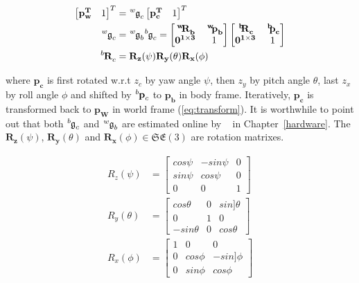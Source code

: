 \begin{equation}\label{eq:transform}
\begin{aligned}
\begin{bmatrix}\mathbf{p^T_w}&1\end{bmatrix}^T&=\tensor*[^w]{\mathfrak{g}}{_c}\begin{bmatrix}\mathbf{p^T_c}&1\end{bmatrix}^T\\
\tensor*[^w]{\mathfrak{g}}{_c}&=\tensor*[^w]{\mathfrak{g}}{_b}\tensor*[^b]{\mathfrak{g}}{_c}=\begin{bmatrix}\mathbf{\tensor*[^w]{R}{_b}}&\mathbf{\tensor*[^w]{p}{_b}}\\\mathbf{0^{1\times3}}&1\end{bmatrix}
\begin{bmatrix}\mathbf{\tensor*[^b]{R}{_c}}&\mathbf{\tensor*[^b]{p}{_c}}\\\mathbf{0^{1\times3}}&1\end{bmatrix}\\
\tensor*[^b]{\mathbf{R}}{_c}&=\mathbf{R_z}(\psi)\mathbf{R_y}(\theta)\mathbf{R_x}(\phi)
\end{aligned}
\end{equation}

where $\mathbf{p_c}$ is first rotated w.r.t $z_c$ by yaw angle $\psi$, then $z_y$ by pitch angle $\theta$, last $z_x$ by roll angle $\phi$ and shifted by $\tensor*[^b]{\mathbf{p}}{_c}$ to $\mathbf{p_b}$ in body frame. Iteratively, $\mathbf{p_c}$ is transformed back to $\mathbf{p_W}$ in world frame (\ref{eq:transform}). It is worthwhile to point out that both $\tensor*[^b]{\mathfrak{g}}{_c}$ and $\tensor*[^w]{\mathfrak{g}}{_b}$ are estimated online by ~\cite{VINS} in Chapter~\ref{hardware}. The $\mathbf{R_z}(\psi)$, $\mathbf{R_y}(\theta)$ and $\mathbf{R_x}(\phi)\in\mathfrak{SE(3)}$ are rotation matrixes.

\begin{equation}\label{eq:rotation}
\begin{aligned}
R_z(\psi)&=\begin{bmatrix}cos\psi&-sin\psi&0\\sin\psi&cos\psi&0\\0&0&1\end{bmatrix}\\
R_y(\theta)&=\begin{bmatrix}cos\theta&0&sin]\theta\\0&1&0\\-sin\theta&0&cos\theta\end{bmatrix}\\
R_x(\phi)&=\begin{bmatrix}1&0&0\\0&cos\phi&-sin]\phi\\0&sin\phi&cos\phi\end{bmatrix}
\end{aligned}
\end{equation}

